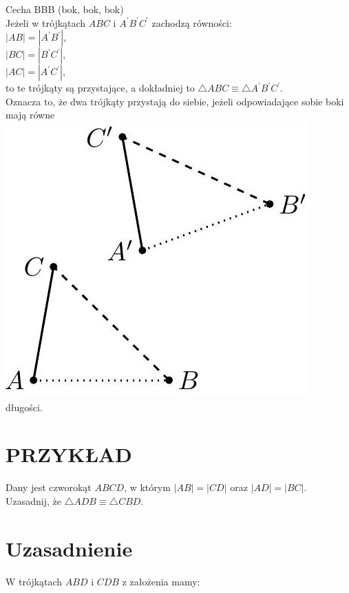 \documentclass[10pt]{article}
\begin{document}
Cecha BBB (bok, bok, bok)\\
Jeżeli w trójkątach \(A B C\) i \(A^{\prime} B^{\prime} C^{\prime}\) zachodzą równości:\\
\(|A B|=\left|A^{\prime} B^{\prime}\right|\),\\
\(|B C|=\left|B^{\prime} C^{\prime}\right|\),\\
\(|A C|=\left|A^{\prime} C^{\prime}\right|\),\\
to te trójkąty są przystające, a dokładniej to \(\triangle A B C \equiv \triangle A^{\prime} B^{\prime} C^{\prime}\).\\
Oznacza to, że dwa trójkąty przystają do siebie, jeżeli odpowiadające sobie boki mają równe\\
\includegraphics[max width=\textwidth, center]{2024_11_21_71f62bd117d375398909g-045}\\
długości.

\section*{PRZYKŁAD}
Dany jest czworokąt \(A B C D\), w którym \(|A B|=|C D|\) oraz \(|A D|=|B C|\). Uzasadnij, że \(\triangle A D B \equiv \triangle C B D\).

\section*{Uzasadnienie}
W trójkątach \(A B D\) i \(C D B\) z założenia mamy:
\end{document}
